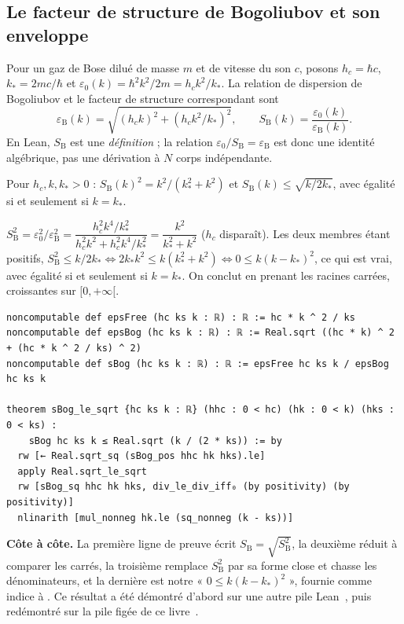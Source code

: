 \subsection{Le facteur de structure de Bogoliubov et son enveloppe}\label{ch3:sec:bog}
Pour un gaz de Bose dilué de masse $m$ et de vitesse du son $c$, posons $h_c=\hbar c$, $k_*=2mc/\hbar$ et
$\varepsilon_0(k)=\hbar^2k^2/2m=h_ck^2/k_*$. La relation de dispersion de Bogoliubov et le facteur de structure
correspondant sont
\[
\varepsilon_{\mathrm B}(k)=\sqrt{(h_ck)^2+(h_ck^2/k_*)^2},\qquad S_{\mathrm B}(k)=\frac{\varepsilon_0(k)}{\varepsilon_{\mathrm B}(k)} .
\]
En Lean, $S_{\mathrm B}$ est une \emph{définition} ; la relation $\varepsilon_0/S_{\mathrm B}=\varepsilon_{\mathrm B}$ est
donc une identité algébrique, pas une dérivation à $N$ corps indépendante.

\begin{proposition}\label{ch3:prop:enveloppe}
Pour $h_c,k,k_*>0$ : $S_{\mathrm B}(k)^2=k^2/(k_*^2+k^2)$ et $S_{\mathrm B}(k)\le\sqrt{k/2k_*}$, avec égalité si et
seulement si $k=k_*$. \tierAs
\end{proposition}
\begin{humanproof}
$S_{\mathrm B}^2=\varepsilon_0^2/\varepsilon_{\mathrm B}^2=\dfrac{h_c^2k^4/k_*^2}{h_c^2k^2+h_c^2k^4/k_*^2}=\dfrac{k^2}{k_*^2+k^2}$
($h_c$ disparaît). Les deux membres étant positifs,
$S_{\mathrm B}^2\le k/2k_*\iff2k_*k^2\le k(k_*^2+k^2)\iff0\le k(k-k_*)^2$, ce qui est vrai, avec égalité si et seulement
si $k=k_*$. On conclut en prenant les racines carrées, croissantes sur $[0,+\infty[$.
\end{humanproof}
\begin{leanbox}
\begin{lstlisting}[style=chIIIlean]
noncomputable def epsFree (hc ks k : ℝ) : ℝ := hc * k ^ 2 / ks
noncomputable def epsBog (hc ks k : ℝ) : ℝ := Real.sqrt ((hc * k) ^ 2 + (hc * k ^ 2 / ks) ^ 2)
noncomputable def sBog (hc ks k : ℝ) : ℝ := epsFree hc ks k / epsBog hc ks k

theorem sBog_le_sqrt {hc ks k : ℝ} (hhc : 0 < hc) (hk : 0 < k) (hks : 0 < ks) :
    sBog hc ks k ≤ Real.sqrt (k / (2 * ks)) := by
  rw [← Real.sqrt_sq (sBog_pos hhc hk hks).le]
  apply Real.sqrt_le_sqrt
  rw [sBog_sq hhc hk hks, div_le_div_iff₀ (by positivity) (by positivity)]
  nlinarith [mul_nonneg hk.le (sq_nonneg (k - ks))]
\end{lstlisting}
\end{leanbox}
\noindent \textbf{Côte à côte.} La première ligne de preuve écrit $S_{\mathrm B}=\sqrt{S_{\mathrm B}^2}$, la deuxième
réduit à comparer les carrés, la troisième remplace $S_{\mathrm B}^2$ par sa forme close et chasse les dénominateurs, et
la dernière est notre « $0\le k(k-k_*)^2$ », fournie comme indice à . Ce résultat a été démontré d'abord
sur une autre pile Lean~\cite{ch3-bsk}, puis redémontré sur la pile figée de ce livre~\cite{ch3-fb}.

